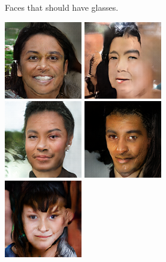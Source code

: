 \begin{figure}[!h]
\begin{subfigure}[b]{\textwidth}
{        }
        \caption{Faces that should have glasses.}
        \vspace{0.1cm}
    \end{subfigure}
    \begin{subfigure}[b]{\textwidth}
        \centerline{
            \includegraphics[scale=0.485]{figures/ffhq/forced-hair-black/ffhq128x128_hair_color_black0000.png}
            \includegraphics[scale=0.485]{figures/ffhq/forced-hair-black/ffhq128x128_hair_color_black0001.png}
            \includegraphics[scale=0.485]{figures/ffhq/forced-hair-black/ffhq128x128_hair_color_black0002.png}
            \includegraphics[scale=0.485]{figures/ffhq/forced-hair-black/ffhq128x128_hair_color_black0003.png}
            \includegraphics[scale=0.485]{figures/ffhq/forced-hair-black/ffhq128x128_hair_color_black0004.png}
}
\end{subfigure}
\end{figure}
